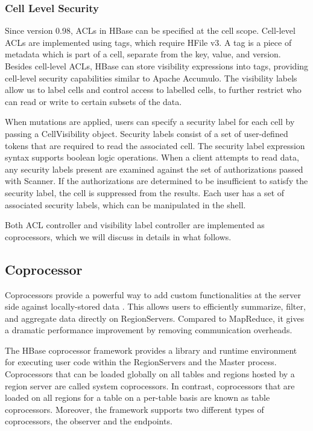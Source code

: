 \documentclass[11pt]{book}
\begin{document}
\subsubsection{Cell Level Security}

Since version 0.98, ACLs in HBase can be specified at the cell scope. Cell-level ACLs are implemented using tags, which require HFile v3. A tag is a piece of metadata which is part of a cell, separate from the key, value, and version.  Besides cell-level ACLs,  HBase can store visibility expressions into tags, providing cell-level security capabilities similar to Apache Accumulo. The visibility labels allow us to label cells and control access to labelled cells, to further restrict who can read or write to certain subsets of the data. 

When mutations are applied, users can specify a security label for each cell by passing a CellVisibility object. Security labels consist of a set of user-defined tokens that are required to read the associated cell. The security label expression syntax supports boolean logic operations. When a client attempts to read data, any security labels present are examined against the set of authorizations passed with Scanner. If the authorizations are determined to be insufficient to satisfy the security label, the cell is suppressed from the results. Each user has a set of associated security labels, which can be manipulated in the shell.

Both ACL controller and visibility label controller are implemented as coprocessors, which we will discuss in details in what follows.

\subsection{Coprocessor}

Coprocessors provide a powerful way to add custom functionalities at the server side against locally-stored data \cite{HBaseCoprocessor}. This allows users to efficiently summarize, filter, and aggregate data directly on RegionServers. Compared to MapReduce, it gives a dramatic performance improvement by removing communication overheads. 

The HBase coprocessor framework provides a library and runtime environment for executing user code within the RegionServers and the Master process. Coprocessors that can be loaded globally on all tables and regions hosted by a region server are called system coprocessors. In contrast, coprocessors that are loaded on all regions for a table on a per-table basis are known as table coprocessors. Moreover, the framework supports two different types of coprocessors, the observer and the endpoints.
\end{document}
